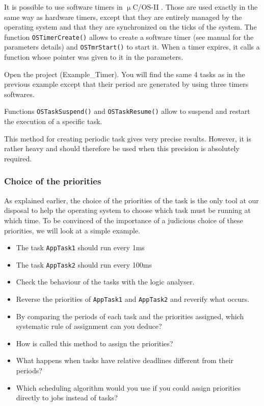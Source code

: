 \documentclass[10pt,a4paper]{article}
\theoremstyle{definition}%
\newcommand{\uCOSII}{$\upmu$C/OS-II }
\newcommand{\kw}[1]{\texttt{#1}}
\begin{document}
It is possible to use software timers in \uCOSII. Those are used exactly in the same way as hardware
timers, except that they are entirely managed by the operating system and that they are synchronized
on the ticks of the system.
The function \kw{OSTimerCreate()} allows to create a software timer (see manual for the parameters
details) and \kw{OSTmrStart()} to start it. When a timer expires, it calls a function whose pointer was given
to it in the parameters.

Open the project (Example\_Timer).
You will find the same 4 tasks as in the previous example except that their period are generated by
using three timers softwares.

Functions \kw{OSTaskSuspend()} and \kw{OSTaskResume()} allow to suspend and restart the execution of a
specific task.


This method for creating periodic task gives very precise results. However, it is rather heavy and
should therefore be used when this precision is absolutely required.


\subsubsection{Choice of the priorities}

As explained earlier, the choice of the priorities of the task is the only tool at our disposal to help the
operating system to choose which task must be running at which time. To be convinced of the
importance of a judicious choice of these priorities, we will look at a simple example.
\begin{itemize}
\item The task \kw{AppTask1} should run every 1ms
\item The task \kw{AppTask2} should run every 100ms
\end{itemize}

\begin{itemize}
\item Check the behaviour of the tasks with the logic analyser.
\item Reverse the priorities of \kw{AppTask1} and \kw{AppTask2} and reverify what occurs.
\item By comparing the periods of each task and the priorities assigned, which systematic rule of
assignment can you deduce?
\item How is called this method to assign the priorities?
\item What happens when tasks have relative deadlines different from their periods?
\item Which scheduling algorithm would you use if you could assign priorities directly to jobs instead of
tasks?
\end{itemize}
\end{document}
